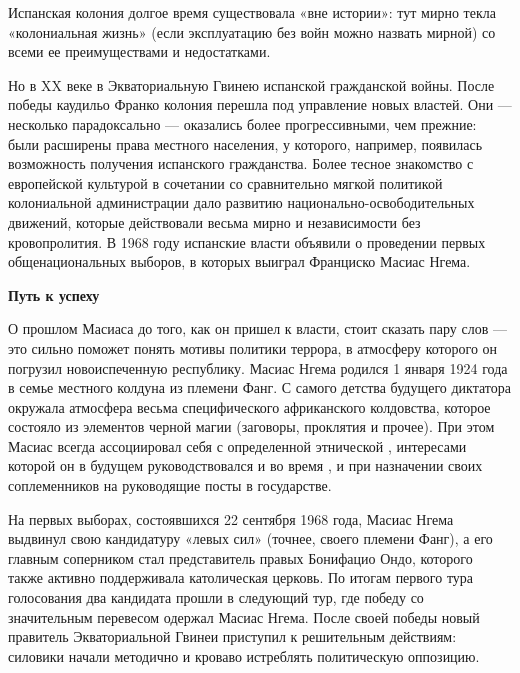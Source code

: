 \begin{fancyquotes}
    Испанская колония долгое время существовала «вне истории»: тут мирно текла «колониальная жизнь» (если эксплуатацию без войн можно назвать мирной) со всеми ее преимуществами и недостатками.
\end{fancyquotes}

Но в XX веке в Экваториальную Гвинею   испанской гражданской войны. После победы каудильо Франко колония перешла под управление новых властей. Они --- несколько парадоксально --- оказались более прогрессивными, чем прежние: были расширены права местного населения, у которого, например, появилась возможность получения испанского гражданства. Более тесное знакомство с европейской культурой в сочетании со сравнительно мягкой политикой колониальной администрации дало  развитию национально-освободительных движений, которые действовали весьма мирно и  независимости без кровопролития. В 1968 году испанские власти объявили о проведении первых общенациональных выборов, в которых выиграл Франциско Масиас Нгема.


\textbf{Путь к успеху}

О прошлом Масиаса до того, как он пришел к власти, стоит сказать пару слов --- это сильно поможет понять мотивы политики террора, в атмосферу которого он погрузил новоиспеченную республику. Масиас Нгема родился 1 января 1924 года в семье местного колдуна из племени Фанг. С самого детства будущего диктатора окружала атмосфера весьма специфического африканского колдовства, которое  состояло из элементов черной магии (заговоры, проклятия и прочее). При этом Масиас всегда ассоциировал себя с определенной этнической , интересами которой он в будущем руководствовался и во время , и при назначении своих соплеменников на руководящие посты в государстве.

На первых выборах, состоявшихся 22 сентября 1968 года, Масиас Нгема выдвинул свою кандидатуру  «левых сил» (точнее, своего племени Фанг), а его главным соперником стал представитель правых Бонифацио Ондо, которого также активно поддерживала католическая церковь. По итогам первого тура голосования два кандидата прошли в следующий тур, где победу со значительным перевесом одержал Масиас Нгема. После своей победы новый правитель Экваториальной Гвинеи  приступил к решительным действиям: силовики начали методично и кроваво истреблять политическую оппозицию.

